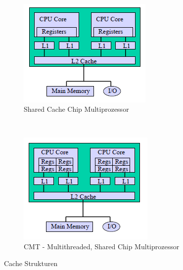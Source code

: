\begin{figure}
	~
	\begin{subfigure}[b]{0.25\textwidth}
		\includegraphics[width=\textwidth]{fig/mc_shared_cache}
		\caption{Shared Cache Chip Multiprozessor}
		\label{fig:mc_shared_cache_chip}
	\end{subfigure}
	~
	\begin{subfigure}[b]{0.25\textwidth}
		\includegraphics[width=\textwidth]{fig/mc_shared_cache_mt}
		\caption{CMT - Multithreaded, Shared Chip Multiprozessor}
		\label{fig:mc_shared_cache:mt}
	\end{subfigure}
	
	\caption{Cache Strukturen}
	\label{fig:cache_strukturen}
\end{figure}

